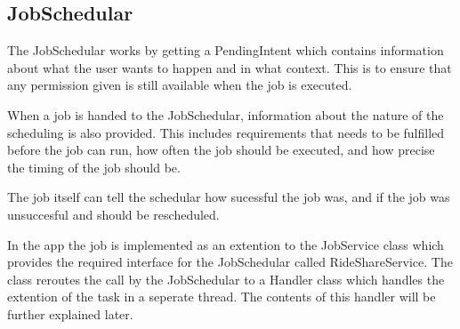 \subsection{JobSchedular}

The JobSchedular works by getting a PendingIntent which contains information about what the user wants to happen and in what context.
This is to ensure that any permission given is still available when the job is executed.

When a job is handed to the JobSchedular, information about the nature of the scheduling is also provided.
This includes requirements that needs to be fulfilled before the job can run, how often the job should be executed, and how precise the timing of the job should be.

The job itself can tell the schedular how sucessful the job was, and if the job was unsuccesful and should be rescheduled.

In the app the job is implemented as an extention to the JobService class which provides the required interface for the JobSchedular called RideShareService.
The class reroutes the call by the JobSchedular to a Handler class which handles the extention of the task in a seperate thread.
The contents of this handler will be further explained later. 
